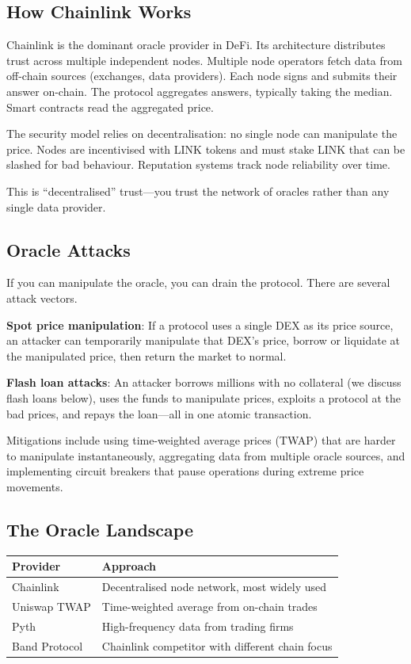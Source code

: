 \documentclass[11pt,a4paper]{article}
\begin{document}
\subsection{How Chainlink Works}

Chainlink is the dominant oracle provider in DeFi. Its architecture distributes trust across multiple independent nodes. Multiple node operators fetch data from off-chain sources (exchanges, data providers). Each node signs and submits their answer on-chain. The protocol aggregates answers, typically taking the median. Smart contracts read the aggregated price.

The security model relies on decentralisation: no single node can manipulate the price. Nodes are incentivised with LINK tokens and must stake LINK that can be slashed for bad behaviour. Reputation systems track node reliability over time.

This is ``decentralised'' trust---you trust the network of oracles rather than any single data provider.

\subsection{Oracle Attacks}

If you can manipulate the oracle, you can drain the protocol. There are several attack vectors.

\textbf{Spot price manipulation}: If a protocol uses a single DEX as its price source, an attacker can temporarily manipulate that DEX's price, borrow or liquidate at the manipulated price, then return the market to normal.

\textbf{Flash loan attacks}: An attacker borrows millions with no collateral (we discuss flash loans below), uses the funds to manipulate prices, exploits a protocol at the bad prices, and repays the loan---all in one atomic transaction.

Mitigations include using time-weighted average prices (TWAP) that are harder to manipulate instantaneously, aggregating data from multiple oracle sources, and implementing circuit breakers that pause operations during extreme price movements.

\subsection{The Oracle Landscape}

\begin{center}
\begin{tabular}{lp{8cm}}
\toprule
\textbf{Provider} & \textbf{Approach} \\
\midrule
Chainlink & Decentralised node network, most widely used \\
Uniswap TWAP & Time-weighted average from on-chain trades \\
Pyth & High-frequency data from trading firms \\
Band Protocol & Chainlink competitor with different chain focus \\
\bottomrule
\end{tabular}
\end{center}
\end{document}
